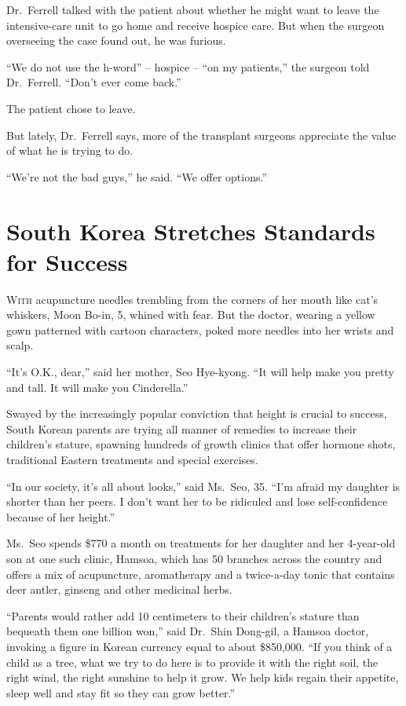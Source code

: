 ﻿\documentclass[12pt]{article}
\begin{document}
Dr.~Ferrell talked with the patient about whether he might want to leave the intensive-care unit to
go home and receive hospice care. But when the surgeon overseeing the case found out, he was
furious.

``We do not use the h-word'' -- hospice -- ``on my patients,'' the surgeon told Dr.~Ferrell. ``Don't
ever come back.''

The patient chose to leave.

But lately, Dr.~Ferrell says, more of the transplant surgeons appreciate the value of what he is
trying to do.

``We're not the bad guys,'' he said. ``We offer options.''

\section{South Korea Stretches Standards for Success}

\lettrine{W}{ith} acupuncture needles trembling from the corners of her
mouth like cat's whiskers, Moon Bo-in, 5, whined with fear. But the doctor, wearing a yellow gown
patterned with cartoon characters, poked more needles into her wrists and scalp.

``It's O.K., dear,'' said her mother, Seo Hye-kyong. ``It will help make you pretty and tall. It
will make you Cinderella.''

Swayed by the increasingly popular conviction that height is crucial to success, South Korean
parents are trying all manner of remedies to increase their children's stature, spawning hundreds of
growth clinics that offer hormone shots, traditional Eastern treatments and special exercises.

``In our society, it's all about looks,'' said Ms.~Seo, 35. ``I'm afraid my daughter is shorter than
her peers. I don't want her to be ridiculed and lose self-confidence because of her height.''

Ms.~Seo spends \$770 a month on treatments for her daughter and her 4-year-old son at one such
clinic, Hamsoa, which has 50 branches across the country and offers a mix of acupuncture,
aromatherapy and a twice-a-day tonic that contains deer antler, ginseng and other medicinal herbs.

``Parents would rather add 10 centimeters to their children's stature than bequeath them one billion
won,'' said Dr.~Shin Dong-gil, a Hamsoa doctor, invoking a figure in Korean currency equal to about
\$850,000. ``If you think of a child as a tree, what we try to do here is to provide it with the
right soil, the right wind, the right sunshine to help it grow. We help kids regain their appetite,
sleep well and stay fit so they can grow better.''
\end{document}
